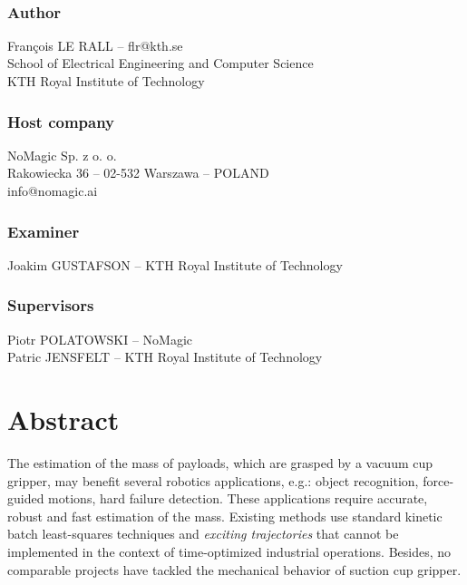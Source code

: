 \documentclass[/home/francois/latex/report/main.tex]{subfiles}
\begin{document}
\newpage
\thispagestyle{plain}

~

\vfill

{ 
	\subsection*{Author}
	François LE RALL – flr@kth.se\\
	School of Electrical Engineering and Computer Science\\
	KTH Royal Institute of Technology

	\subsection*{Host company}
	NoMagic Sp. z o. o.\\
	Rakowiecka 36 – 02-532 Warszawa – POLAND\\
	info@nomagic.ai

	\subsection*{Examiner}
	Joakim GUSTAFSON – KTH Royal Institute of Technology

	\subsection*{Supervisors}
	Piotr POLATOWSKI – NoMagic\\
	Patric JENSFELT – KTH Royal Institute of Technology
	~
}


\newpage
\thispagestyle{plain}
\chapter*{Abstract}

The estimation of the mass of payloads, which are grasped by a vacuum cup gripper, may benefit several robotics applications, e.g.: object recognition, force-guided motions, hard failure detection. These applications require accurate, robust and fast estimation of the mass. Existing methods use standard kinetic batch least-squares techniques and \textit{exciting trajectories} that cannot be implemented in the context of time-optimized industrial operations. Besides, no comparable projects have tackled the mechanical behavior of suction cup gripper.
\end{document}

